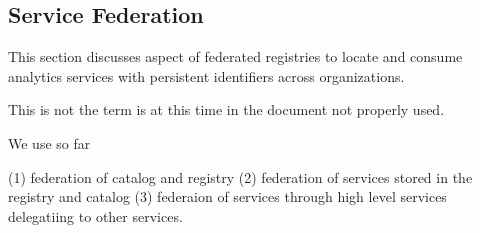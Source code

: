
\subsection{Service Federation}
\label{sec:federation}

This section discusses aspect of federated registries to locate and
consume analytics services with persistent identifiers across
organizations.

This is not the term is at this time in the document not properly used.

We use so far 

(1) federation of catalog and registry
(2) federation of services stored in the registry and catalog
(3) federaion of services through high level services delegatiing to other services. 

